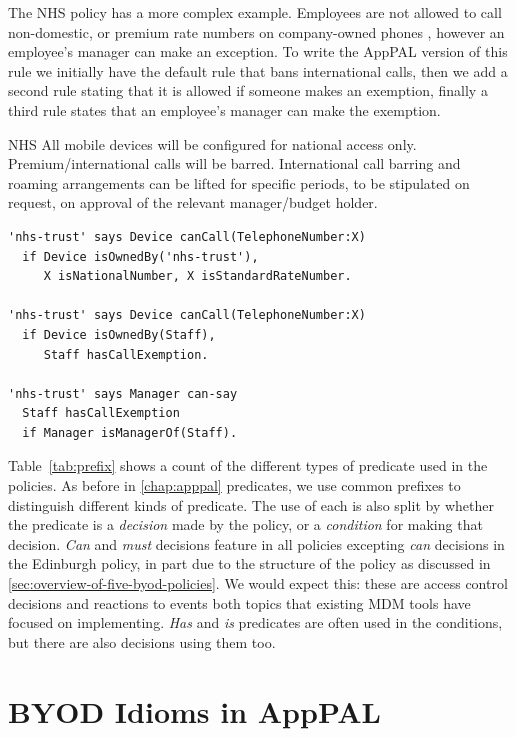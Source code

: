 \documentclass[thesis.tex]{subfiles}
\begin{document}
The NHS policy has a more complex example. Employees are not
allowed to call non-domestic, or premium rate numbers on company-owned
phones , however an employee's manager can make an exception.
To write the AppPAL version of this rule we initially have the default
rule that bans international calls, then we add a second rule stating that it is
allowed if someone makes an exemption, finally a third rule states that an employee's manager 
can make the exemption.

\begin{policyrule}{NHS}
  All mobile devices will be configured for national access only. Premium/international calls will be barred.
  International call barring and roaming arrangements can be lifted for specific periods, to be stipulated on request, on approval of the relevant manager/budget holder.
  \normalfont
  \begin{lstlisting}
'nhs-trust' says Device canCall(TelephoneNumber:X)
  if Device isOwnedBy('nhs-trust'),
     X isNationalNumber, X isStandardRateNumber.

'nhs-trust' says Device canCall(TelephoneNumber:X)
  if Device isOwnedBy(Staff),
     Staff hasCallExemption.

'nhs-trust' says Manager can-say
  Staff hasCallExemption
  if Manager isManagerOf(Staff).
  \end{lstlisting}
\end{policyrule}

Table~\ref{tab:prefix} shows a count of the different types of
predicate used in the policies.  As before in \autoref{chap:apppal}
predicates, we use common prefixes to distinguish different kinds of
predicate.  The use of each is also split by whether the predicate is
a \emph{decision} made by the policy, or a \emph{condition} for making
that decision. \emph{Can} and \emph{must} decisions feature in all
policies excepting \emph{can} decisions in the Edinburgh policy, in
part due to the structure of the policy as discussed in
\autoref{sec:overview-of-five-byod-policies}. We would expect this: these are access
control decisions and reactions to events both topics that existing
\ac{MDM} tools have focused on implementing. \emph{Has} and \emph{is}
predicates are often used in the conditions, but there are also
decisions using them too.

\section{BYOD Idioms in AppPAL}
\label{sec:common_concerns}
\end{document}

